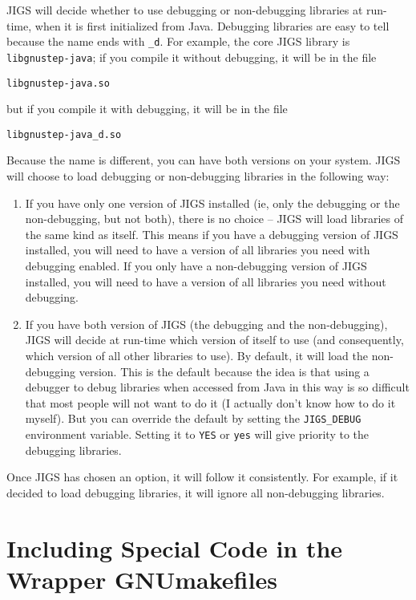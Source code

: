 JIGS will decide whether to use debugging or non-debugging libraries
at run-time, when it is first initialized from Java.  Debugging
libraries are easy to tell because the name ends with \texttt{\_d}.
For example, the core JIGS library is
\texttt{libgnustep-java}; if you compile it without debugging, it will 
be in the file 
\begin{verbatim}
libgnustep-java.so
\end{verbatim}
but if you compile it with debugging, it will be in the file 
\begin{verbatim}
libgnustep-java_d.so
\end{verbatim}
Because the name is different, you can have both versions on your
system.  JIGS will choose to load debugging or non-debugging libraries
in the following way:
\begin{enumerate}
\item If you have only one version of JIGS installed (ie, only the debugging 
or the non-debugging, but not both), there is no choice -- JIGS will
load libraries of the same kind as itself.  This means if you have a
debugging version of JIGS installed, you will need to have a version
of all libraries you need with debugging enabled.  If you only have a
non-debugging version of JIGS installed, you will need to have a
version of all libraries you need without debugging.
\item If you have both version of JIGS (the debugging and the non-debugging), 
JIGS will decide at run-time which version of itself to use (and
consequently, which version of all other libraries to use).  By
default, it will load the non-debugging version.  This is the default
because the idea is that using a debugger to debug libraries when
accessed from Java in this way is so difficult that most people will
not want to do it (I actually don't know how to do it myself).  But
you can override the default by setting the \texttt{JIGS\_DEBUG}
environment variable.  Setting it to \texttt{YES} or \texttt{yes} will
give priority to the debugging libraries.
\end{enumerate}
Once JIGS has chosen an option, it will follow it consistently.  For
example, if it decided to load debugging libraries, it will ignore all
non-debugging libraries.

\section{Including Special Code in the Wrapper GNUmakefiles}

